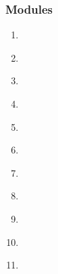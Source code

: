 \begin{frame}[fragile,label=outline] 
\frametitle{Modules}
\begin{center}
\begin{minipage}{3.25in}
\begin{enumerate}
\item  \hyperlink{s-intro<1>}      {\BUTTON {\orow{\sIntro}}} \\
\item  \hyperlink{s-present<1>}    {\BUTTON {\erow{\sPresent}}} \\
\item  \hyperlink{s-recent<1>}    {\BUTTON {\erow{\sRecent}}} \\
\item  \hyperlink{s-future<1>}     {\BUTTON {\orow{\sFuture}}} \\
\item  \hyperlink{s-project<1>}    {\BUTTON {\erow{\sProject}}} \\
\item  \hyperlink{s-starting<1>}   {\BUTTON {\orow{\sStarting}}} \\
\item  \hyperlink{s-parameters<1>} {\BUTTON {\erow{\sParameters}}} \\
\item  \hyperlink{s-charm<1>}      {\BUTTON {\orow{\sCharm}}} \\
\item \hyperlink{s-design<1>}      {\BUTTON {\erow{\sDesign}}} \\
\item \hyperlink{s-control<1>}      {\BUTTON {\orow{\sControl}}} \\
\item  \hyperlink{s-devel<1>} {\BUTTON {\erow{\sDevel}}}
\end{enumerate}
\end{minipage}
\end{center}
\end{frame}


  
  
  
  
  

  
  
  

  
  

  
  


